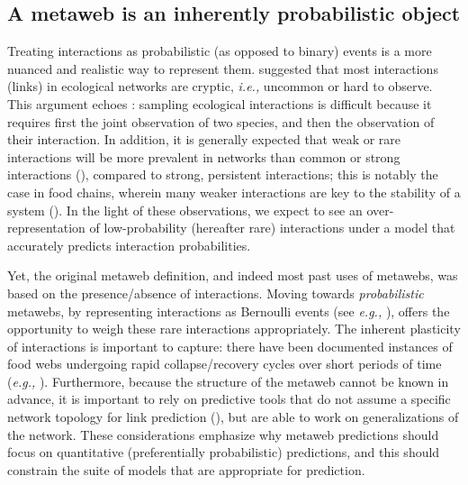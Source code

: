 \begin{refsection}
\section{A metaweb is an inherently probabilistic
object}\label{a-metaweb-is-an-inherently-probabilistic-object}

Treating interactions as probabilistic (as opposed to binary) events is
a more nuanced and realistic way to represent them.
\cite{Dallas2017Predicting} suggested that most interactions (links) in
ecological networks are cryptic, \emph{i.e.,} uncommon or hard to
observe. This argument echoes \cite{Jordano2016SamNet}: sampling ecological
interactions is difficult because it requires first the joint
observation of two species, and then the observation of their
interaction. In addition, it is generally expected that weak or rare
interactions will be more prevalent in networks than common or strong
interactions (\cite{Csermely2004Strong}), compared to strong, persistent
interactions; this is notably the case in food chains, wherein many
weaker interactions are key to the stability of a system
(\cite{Neutel2002Stability}). In the light of these observations, we
expect to see an over-representation of low-probability (hereafter rare)
interactions under a model that accurately predicts interaction
probabilities.

Yet, the original metaweb definition, and indeed most past uses of
metawebs, was based on the presence/absence of interactions. Moving
towards \emph{probabilistic} metawebs, by representing interactions as
Bernoulli events (see \emph{e.g.,} \cite{Poisot2016Structure}), offers the
opportunity to weigh these rare interactions appropriately. The inherent
plasticity of interactions is important to capture: there have been
documented instances of food webs undergoing rapid collapse/recovery
cycles over short periods of time (\emph{e.g.,} \cite{Pedersen2017Signatures}).
Furthermore, because the structure of the metaweb cannot be known in
advance, it is important to rely on predictive tools that do not assume
a specific network topology for link prediction
(\cite{Gaucher2021Outlier}), but are able to work on generalizations of
the network. These considerations emphasize why metaweb predictions
should focus on quantitative (preferentially probabilistic) predictions,
and this should constrain the suite of models that are appropriate for
prediction.


\end{refsection}
